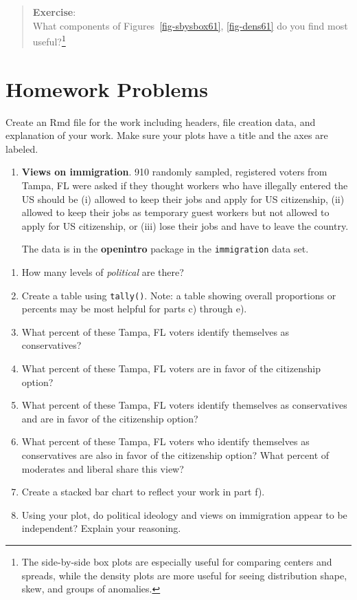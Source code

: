 \documentclass[
  letterpaper,
  DIV=11,
  numbers=noendperiod]{scrreprt}
\begin{document}
\begin{quote}
\textbf{Exercise}:\\
What components of Figures~\ref{fig-sbysbox61}, \ref{fig-dens61} do you
find most useful?\footnote{The side-by-side box plots are especially
  useful for comparing centers and spreads, while the density plots are
  more useful for seeing distribution shape, skew, and groups of
  anomalies.}
\end{quote}

\section{Homework Problems}\label{homework-problems-5}

Create an Rmd file for the work including headers, file creation data,
and explanation of your work. Make sure your plots have a title and the
axes are labeled.

\begin{enumerate}
\def\labelenumi{\arabic{enumi}.}
\item
  \textbf{Views on immigration}. 910 randomly sampled, registered voters
  from Tampa, FL were asked if they thought workers who have illegally
  entered the US should be (i) allowed to keep their jobs and apply for
  US citizenship, (ii) allowed to keep their jobs as temporary guest
  workers but not allowed to apply for US citizenship, or (iii) lose
  their jobs and have to leave the country.

  The data is in the \textbf{openintro} package in the
  \texttt{immigration} data set.
\end{enumerate}

\begin{enumerate}
\def\labelenumi{\alph{enumi}.}
\item
  How many levels of \emph{political} are there?
\item
  Create a table using \texttt{tally()}. Note: a table showing overall
  proportions or percents may be most helpful for parts c) through e).
\item
  What percent of these Tampa, FL voters identify themselves as
  conservatives?
\item
  What percent of these Tampa, FL voters are in favor of the citizenship
  option?
\item
  What percent of these Tampa, FL voters identify themselves as
  conservatives and are in favor of the citizenship option?
\item
  What percent of these Tampa, FL voters who identify themselves as
  conservatives are also in favor of the citizenship option? What
  percent of moderates and liberal share this view?
\item
  Create a stacked bar chart to reflect your work in part f).
\item
  Using your plot, do political ideology and views on immigration appear
  to be independent? Explain your reasoning.
\end{enumerate}
\end{document}

